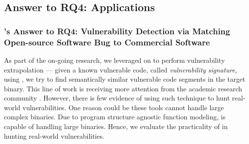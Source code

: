 

\subsection{Answer to RQ4: Applications}\label{sec:evaluation_rq4}
\subsubsection{\tool's Answer to RQ4: Vulnerability Detection via Matching Open-source Software Bug to Commercial Software}
As part of the on-going research, we leveraged on \tool to perform vulnerability extrapolation \cite{pewny2014leveraging} --- given a known vulnerable code, called \textit{vulnerability signature}, using \tool, we try to find semantically similar vulnerable code segments in the target binary. This line of work is receiving  more attention from the academic research community \cite{pewny2014leveraging,DBLP:conf/sp/PewnyGGRH15}. However, there is few evidence of using such technique to hunt real-world vulnerabilities. One reason could be these tools  cannot handle large complex binaries. Due to program structure agnostic function modeling, \tool is capable of handling large binaries. Hence, we evaluate the practicality of \tool in hunting real-world vulnerabilities.

